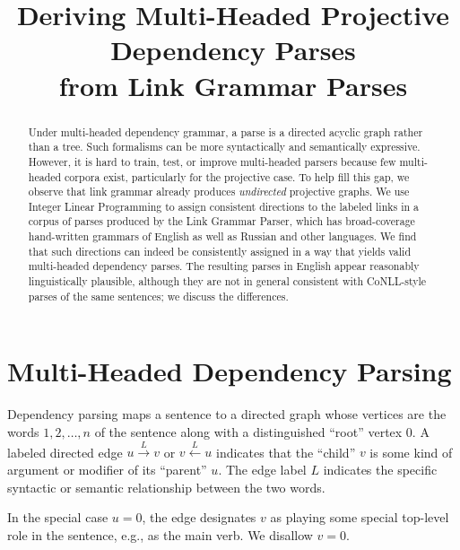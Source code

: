 \documentclass[11pt]{article}
\title{Deriving Multi-Headed Projective Dependency Parses \\ from Link Grammar Parses}
\date{}
\begin{document}
\maketitle

\begin{abstract}
Under multi-headed dependency grammar, a parse is a directed acyclic graph rather than a tree.  Such formalisms can be more syntactically and semantically expressive.  However, 
it is hard to train, test, or improve multi-headed parsers because few multi-headed corpora exist, particularly for the projective case.
To help fill this gap, we observe that link grammar already produces {\em undirected} projective graphs.  
We use Integer Linear Programming to assign consistent directions to the labeled links in a corpus of parses produced by the Link Grammar Parser, which has broad-coverage hand-written grammars of English as well as Russian and other languages.  We find that such directions can indeed be consistently assigned in a way that yields valid multi-headed dependency parses. The resulting parses in English appear reasonably linguistically plausible, although they are not in general consistent with CoNLL-style parses of the same sentences; we discuss the differences.  
\end{abstract}

\section{Multi-Headed Dependency Parsing}

Dependency parsing maps a sentence to a directed graph whose vertices are the words $1, 2, \ldots, n$ of the sentence along with a distinguished ``root'' vertex 0.  A labeled directed edge $u \stackrel{L}{\rightarrow} v$ or $v \stackrel{L}{\leftarrow} u$ indicates that the ``child'' $v$ is some kind of argument or modifier of its ``parent'' $u$.  The edge label $L$ indicates the specific syntactic or semantic relationship between the two words.  

In the special case $u=0$, the edge designates $v$ as playing some special top-level role in the sentence, e.g., as the main verb.  We disallow $v=0$.
\end{document}
